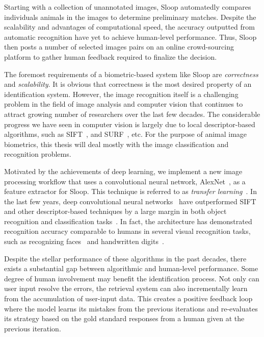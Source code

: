 Starting with a collection of unannotated images, Sloop
automatedly compares individuals animals in the images to determine
preliminary matches. Despite the scalability and advantages of computational
speed, the accuracy	outputted from automatic recognition have yet to achieve
human-level performance.  Thus, Sloop then posts a number of selected images
pairs on an online crowd-sourcing platform to gather human feedback required to
finalize the decision.

The foremost requirements of a biometric-based system like Sloop are
\emph{correctness} and \emph{scalability}. It is obvious that correctness is
the most desired property of an identification system. However, the image
recognition itself is a challenging problem in the field of image analysis and
computer vision that continues to attract growing number of researchers over
the last few decades. The considerable progress we have seen in computer vision
is largely due to local descriptor-based algorithms, such as
SIFT~\cite{lowe04}, and SURF~\cite{surf08}, etc.  For the purpose of animal
image biometrics, this thesis will deal mostly with the image classification
and recognition problems.

Motivated by the achievements of deep learning, we implement a new image
processing workflow that uses a convolutional neural network,
AlexNet~\cite{kriz12}, as a feature extractor for Sloop. This technique is
referred to as \emph{transfer learning}~\cite{transfer, finetune}. In the last
few years, deep convolutional neural networks~\cite{lecun95, kriz12} have
outperformed SIFT and other descriptor-based techniques by a large margin in
both object recognition and classification tasks~\cite{kriz12, fisher14,
ILSVRC15}. In fact, the architecture has demonstrated recognition accuracy
comparable to humans in several visual recognition tasks, such as recognizing
faces~\cite{deepface14} and handwritten digits~\cite{mnist13}.

Despite the stellar performance of these algorithms in the past decades, there
exists a substantial gap between algorithmic and human-level performance. Some
degree of human involvement may benefit the identification process. Not only
can user input resolve the errors, the retrieval system can also incrementally
learn from the accumulation of user-input data. This creates a positive
feedback loop where the model learns its mistakes from the previous iterations
and re-evaluates its strategy based on the gold standard responses from a human
given at the previous iteration.

